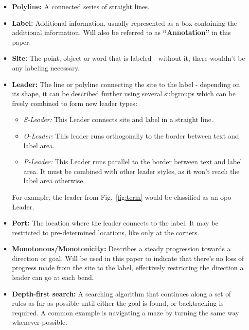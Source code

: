 \documentclass[11pt,a4paper]{vutinfth}
\begin{document}
\begin{itemize}
 
 \item \textbf{Polyline:} A connected series of straight lines.%
 
 \item \textbf{Label:} Additional information, usually represented as a box containing the additional information. Will also be referred to as \textbf{``Annotation''} in this paper.
 \item \textbf{Site:} The point, object or word that is labeled - without it, there wouldn't be any labeling necessary.
 \item \textbf{Leader:} The line or polyline connecting the site to the label - depending on its shape, it can be described further using several subgroups which can be freely combined to form new leader types:
  \begin{itemize}
   \item \textit{S-Leader:} This Leader connects site and label in a straight line.
   \item \textit{O-Leader:} This leader runs orthogonally to the border between text and label area.
   \item \textit{P-Leader:} This Leader runs parallel to the border between text and label area. It must be combined with other leader styles, as it won't reach the label area otherwise.
  \end{itemize}
    For example, the leader from Fig.~\ref{fig:term} would be classified as an opo-Leader.
 \item \textbf{Port:} The location where the leader connects to the label. It may be restricted to pre-determined locations, like only at the corners.
  \item \textbf{Monotonous/Monotonicity:} Describes a steady progression towards a direction or goal. Will be used in this paper to indicate that there's no loss of progress made from the site to the label, effectively restricting the direction a leader can go at each bend.
  \item \textbf{Depth-first search:} A searching algorithm that continues along a set of rules as far as possible until either the goal is found, or backtracking is required. A common example is navigating a maze by turning the same way whenever possible.
\end{itemize}
\end{document}

